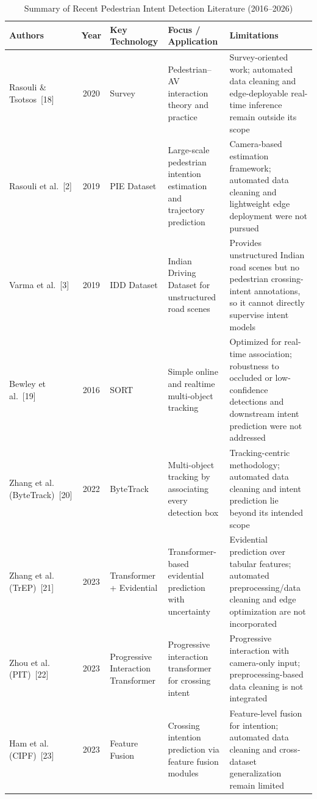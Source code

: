 \documentclass[conference]{IEEEtran}
\begin{document}
\begin{table}[htbp]
\centering
\caption{Summary of Recent Pedestrian Intent Detection Literature (2016--2026)}
\label{tab:related_work}
\small
\setlength{\tabcolsep}{3pt}
\begin{tabular}{|p{2.2cm}|c|p{2.5cm}|p{4.0cm}|p{4.5cm}|}
\hline
\textbf{Authors} & \textbf{Year} & \textbf{Key Technology} & \textbf{Focus / Application} & \textbf{Limitations} \\
\hline
Rasouli \& Tsotsos~[18] & 2020 & Survey & Pedestrian--AV interaction theory and practice & Survey-oriented work; automated data cleaning and edge-deployable real-time inference remain outside its scope \\
\hline
Rasouli et al.~[2] & 2019 & PIE Dataset & Large-scale pedestrian intention estimation and trajectory prediction & Camera-based estimation framework; automated data cleaning and lightweight edge deployment were not pursued \\
\hline
Varma et al.~[3] & 2019 & IDD Dataset & Indian Driving Dataset for unstructured road scenes & Provides unstructured Indian road scenes but no pedestrian crossing-intent annotations, so it cannot directly supervise intent models \\
\hline
Bewley et al.~[19] & 2016 & SORT & Simple online and realtime multi-object tracking & Optimized for real-time association; robustness to occluded or low-confidence detections and downstream intent prediction were not addressed \\
\hline
Zhang et al. (ByteTrack)~[20] & 2022 & ByteTrack & Multi-object tracking by associating every detection box & Tracking-centric methodology; automated data cleaning and intent prediction lie beyond its intended scope \\
\hline
Zhang et al. (TrEP)~[21] & 2023 & Transformer + Evidential & Transformer-based evidential prediction with uncertainty & Evidential prediction over tabular features; automated preprocessing/data cleaning and edge optimization are not incorporated \\
\hline
Zhou et al. (PIT)~[22] & 2023 & Progressive Interaction Transformer & Progressive interaction transformer for crossing intent & Progressive interaction with camera-only input; preprocessing-based data cleaning is not integrated \\
\hline
Ham et al. (CIPF)~[23] & 2023 & Feature Fusion & Crossing intention prediction via feature fusion modules & Feature-level fusion for intention; automated data cleaning and cross-dataset generalization remain limited \\

\end{tabular}
\end{table}
\end{document}
